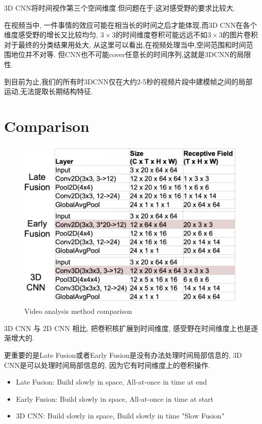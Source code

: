 3D CNN将时间视作第三个空间维度.但问题在于:这对感受野的要求比较大.

在视频当中,
一件事情的效应可能在相当长的时间之后才能体现,而3D CNN在各个维度感受野的增长又比较均匀,
$3\times3$的时间维度卷积可能远远不如$3\times3$的图片卷积对于最终的分类结果用处大,
从这里可以看出,在视频处理当中,空间范围和时间范围地位并不对等.
但CNN也不可能cover任意长的时间序列,这就是3DCNN的局限性.

到目前为止,我们的所有时3DCNN仅在大约2-5秒的视频片段中建模帧之间的局部运动,无法提取长期结构特征.

\section{Comparison}

\begin{figure}[htbp]
    \centering
    \includegraphics[scale=0.35]{figures/video_cmp.png}
    \caption{Video analysis method comparison}
\end{figure}

3D CNN 与 2D CNN 相比, 把卷积核扩展到时间维度, 感受野在时间维度上也是逐渐增大的.

更重要的是Late Fusion或者Early Fusion是没有办法处理时间局部信息的, 
3D CNN是可以处理时间局部信息的, 因为它有时间维度上的卷积操作.

\begin{itemize}
    \item Late Fusion: Build slowly in space, All-at-once in time at end
    \item Early Fusion: Build slowly in space, All-at-once in time at start
    \item 3D CNN: Build slowly in space, Build slowly in time "Slow Fusion"
\end{itemize}

